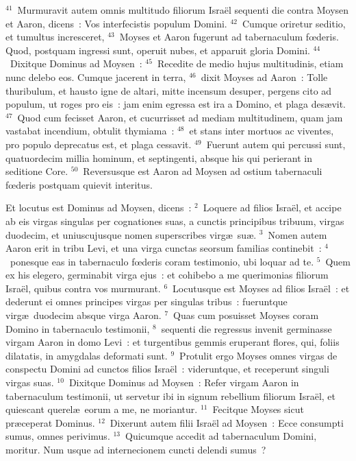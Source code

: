 ${}^{41}$~Murmuravit autem omnis multitudo filiorum Isra\"el sequenti die contra Moysen et Aaron, dicens~: Vos interfecistis populum Domini.
${}^{42}$~Cumque oriretur seditio, et tumultus incresceret,
${}^{43}$~Moyses et Aaron fugerunt ad tabernaculum fœderis. Quod, postquam ingressi sunt, operuit nubes, et apparuit gloria Domini.
${}^{44}$~Dixitque Dominus ad Moysen~:
${}^{45}$~Recedite de medio hujus multitudinis, etiam nunc delebo eos. Cumque jacerent in terra,
${}^{46}$~dixit Moyses ad Aaron~: Tolle thuribulum, et hausto igne de altari, mitte incensum desuper, pergens cito ad populum, ut roges pro eis~: jam enim egressa est ira a Domino, et plaga des\ae vit.
${}^{47}$~Quod cum fecisset Aaron, et cucurrisset ad mediam multitudinem, quam jam vastabat incendium, obtulit thymiama~:
${}^{48}$~et stans inter mortuos ac viventes, pro populo deprecatus est, et plaga cessavit.
${}^{49}$~Fuerunt autem qui percussi sunt, quatuordecim millia hominum, et septingenti, absque his qui perierant in seditione Core.
${}^{50}$~Reversusque est Aaron ad Moysen ad ostium tabernaculi fœderis postquam quievit interitus.

\lettrine[lines=3,image=true,loversize=0.05,lraise=-0.03]{E}{}t locutus est Dominus ad Moysen, dicens~:
${}^{2}$~Loquere ad filios Isra\"el, et accipe ab eis virgas singulas per cognationes suas, a cunctis principibus tribuum, virgas duodecim, et uniuscujusque nomen superscribes virg\ae\ su\ae .
${}^{3}$~Nomen autem Aaron erit in tribu Levi, et una virga cunctas seorsum familias continebit~:
${}^{4}$~ponesque eas in tabernaculo fœderis coram testimonio, ubi loquar ad te.
${}^{5}$~Quem ex his elegero, germinabit virga ejus~: et cohibebo a me querimonias filiorum Isra\"el, quibus contra vos murmurant.
${}^{6}$~Locutusque est Moyses ad filios Isra\"el~: et dederunt ei omnes principes virgas per singulas tribus~: fueruntque virg\ae\ duodecim absque virga Aaron.
${}^{7}$~Quas cum posuisset Moyses coram Domino in tabernaculo testimonii,
${}^{8}$~sequenti die regressus invenit germinasse virgam Aaron in domo Levi~: et turgentibus gemmis eruperant flores, qui, foliis dilatatis, in amygdalas deformati sunt.
${}^{9}$~Protulit ergo Moyses omnes virgas de conspectu Domini ad cunctos filios Isra\"el~: videruntque, et receperunt singuli virgas suas.
${}^{10}$~Dixitque Dominus ad Moysen~: Refer virgam Aaron in tabernaculum testimonii, ut servetur ibi in signum rebellium filiorum Isra\"el, et quiescant querel\ae\ eorum a me, ne moriantur.
${}^{11}$~Fecitque Moyses sicut pr\ae ceperat Dominus.
${}^{12}$~Dixerunt autem filii Isra\"el ad Moysen~: Ecce consumpti sumus, omnes perivimus.
${}^{13}$~Quicumque accedit ad tabernaculum Domini, moritur. Num usque ad internecionem cuncti delendi sumus~?

